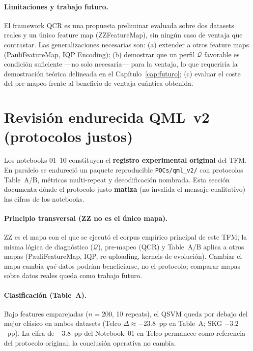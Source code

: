 \paragraph{Limitaciones y trabajo futuro.}
El framework QCR es una propuesta preliminar evaluada sobre dos datasets reales y un único feature map (ZZFeatureMap), sin ningún caso de ventaja que contrastar. Las generalizaciones necesarias son: (a) extender a otros feature maps (PauliFeatureMap, IQP Encoding); (b) demostrar que un perfil $\mathcal{Q}$ favorable es condición suficiente ---no solo necesaria--- para la ventaja, lo que requeriría la demostración teórica delineada en el Capítulo~\ref{cap:futuro}; (c) evaluar el coste del pre-mapeo frente al beneficio de ventaja cuántica obtenida.

\section{Revisión endurecida QML~v2 (protocolos justos)}
\label{sec:qml_v2_revision}

Los notebooks 01--10 constituyen el \textbf{registro experimental original} del TFM. En paralelo se endureció un paquete reproducible \texttt{POCs/qml\_v2/} con protocolos Table~A/B, métricas multi-repeat y decodificación nombrada. Esta sección documenta dónde el protocolo justo \textbf{matiza} (no invalida el mensaje cualitativo) las cifras de los notebooks.

\paragraph{Principio transversal (ZZ no es el único mapa).}
ZZ es el mapa con el que se ejecutó el corpus empírico principal de este TFM; la misma lógica de diagnóstico ($\mathcal{Q}$), pre-mapeo (QCR) y Table~A/B aplica a otros mapas (PauliFeatureMap, IQP, re-uploading, kernels de evolución). Cambiar el mapa cambia \emph{qué} datos podrían beneficiarse, no el protocolo; comparar mapas sobre datos reales queda como trabajo futuro.

\paragraph{Clasificación (Table~A).}
Bajo features emparejadas ($n=200$, 10 repeats), el QSVM queda por debajo del mejor clásico en ambos datasets (Telco $\Delta\approx -23.8$~pp en Table~A; SKG $-3.2$~pp). La cifra de $-3.8$~pp del Notebook~01 en Telco permanece como referencia del protocolo original; la conclusión operativa no cambia.

